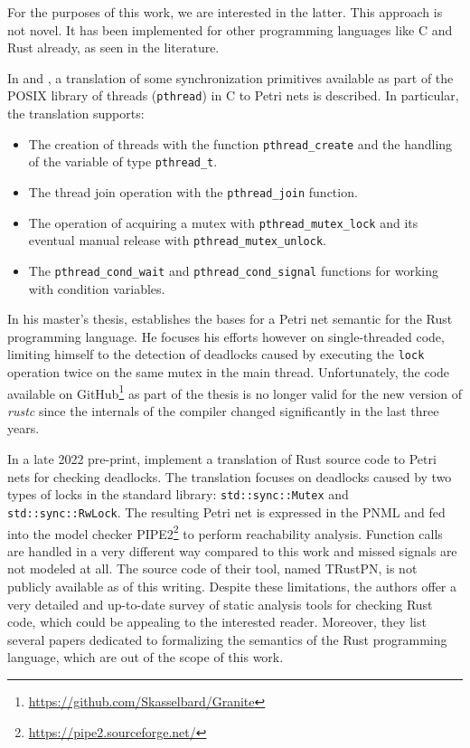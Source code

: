 \documentclass[../../Thesis.tex]{subfiles}
\begin{document}
For the purposes of this work, we are interested in the latter.
This approach is not novel.
It has been implemented for other programming languages like C and Rust already,
as seen in the literature.

In \cite{kavi2002modeling} and \cite{moshtaghi2001},
a translation of some synchronization primitives available as part of
the POSIX library of threads (\texttt{pthread}) in C to Petri nets is described.
In particular, the translation supports:

\begin{itemize}
    \item The creation of threads with the function \texttt{pthread\_create}
          and the handling of the variable of type \texttt{pthread\_t}.
    \item The thread join operation with the \texttt{pthread\_join} function.
    \item The operation of acquiring a mutex with \texttt{pthread\_mutex\_lock}
          and its eventual manual release with \texttt{pthread\_mutex\_unlock}.
    \item The \texttt{pthread\_cond\_wait} and \texttt{pthread\_cond\_signal} functions
          for working with condition variables.
\end{itemize}

In his master's thesis, \cite{meyer2020} establishes
the bases for a Petri net semantic for the Rust programming language.
He focuses his efforts however on single-threaded code,
limiting himself to the detection of deadlocks caused by
executing the \texttt{lock} operation twice on the same mutex in the main thread.
Unfortunately, the code available on GitHub\footnote{\url{https://github.com/Skasselbard/Granite}}
as part of the thesis is no longer valid for the new version of \emph{rustc}
since the internals of the compiler changed significantly in the last three years.

In a late 2022 pre-print, \cite{zhang2022deadlocks} implement a translation
of Rust source code to Petri nets for checking deadlocks.
The translation focuses on deadlocks caused by two types of locks
in the standard library: \texttt{std::sync::Mutex} and \texttt{std::sync::RwLock}.
The resulting Petri net is expressed in the \acrfull{PNML}
and fed into the model checker \acrfull{PIPE2}\footnote{\url{https://pipe2.sourceforge.net/}}
to perform reachability analysis.
Function calls are handled in a very different way compared to this work and
missed signals are not modeled at all.
The source code of their tool, named TRustPN, is not publicly available as of this writing.
Despite these limitations, the authors offer a very detailed and up-to-date survey
of static analysis tools for checking Rust code,
which could be appealing to the interested reader.
Moreover, they list several papers dedicated to
formalizing the semantics of the Rust programming language,
which are out of the scope of this work.
\end{document}

